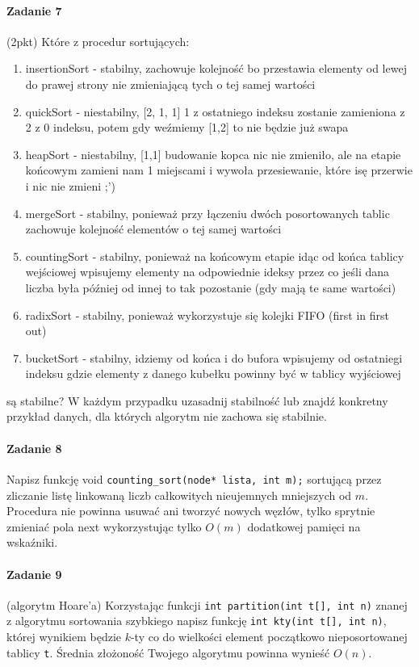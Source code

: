 \documentclass[18pt]{extarticle}
\begin{document}
\paragraph{Zadanie 7} (2pkt) Które z procedur sortujących:
\begin{enumerate}
    \item insertionSort - stabilny, zachowuje kolejność bo przestawia elementy od lewej do prawej strony nie zmieniającą tych o tej samej wartości
    \item quickSort - niestabilny, [2, 1, 1] 1 z ostatniego indeksu zostanie zamieniona z 2 z 0 indeksu, potem gdy weźmiemy [1,2] to nie będzie już swapa 
    \item heapSort - niestabilny, [1,1] budowanie kopca nic nie zmieniło, ale na etapie końcowym zamieni nam 1 miejscami i wywoła przesiewanie, które isę przerwie i nic nie zmieni ;')
    \item mergeSort - stabilny, ponieważ przy łączeniu dwóch posortowanych tablic zachowuje kolejność elementów o tej samej wartości
    \item countingSort - stabilny, ponieważ na końcowym etapie idąc od końca tablicy wejściowej wpisujemy elementy na odpowiednie ideksy przez co jeśli dana liczba była później od innej to tak pozostanie (gdy mają te same wartości)
    \item radixSort - stabilny, ponieważ wykorzystuje się kolejki FIFO (first in first out)
    \item bucketSort - stabilny, idziemy od końca i do bufora wpisujemy od ostatniegi indeksu gdzie elementy z danego kubełku powinny być w tablicy wyjściowej
\end{enumerate}
są stabilne? W każdym przypadku uzasadnij stabilność lub znajdź konkretny przykład danych, dla których algorytm nie zachowa się stabilnie.

\paragraph{Zadanie 8} Napisz funkcję void \verb+counting_sort(node* lista, int m);+ sortującą przez zliczanie listę linkowaną liczb całkowitych nieujemnych mniejszych od $m$. Procedura nie powinna usuwać ani tworzyć nowych węzłów, tylko sprytnie zmieniać pola next wykorzystując tylko $O(m)$ dodatkowej pamięci na wskaźniki.

\paragraph{Zadanie 9} (algorytm Hoare'a) Korzystając funkcji \verb+int partition(int t[], int n)+ znanej z algorytmu sortowania szybkiego napisz funkcję \verb+int kty(int t[], int n)+, której wynikiem będzie $k$-ty co do wielkości element początkowo nieposortowanej tablicy \verb+t+. Średnia złożoność Twojego algorytmu powinna wynieść $O(n)$.
\end{document}
